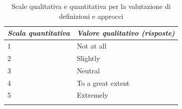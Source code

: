     \begin{center}
		\hspace*{-5mm}%
	\end{center}
	
     \begin{longtable}{| p{} | p{} |} 
      
      \hline\textbf{\textit{Scala quantitativa}} & \textbf{\textit{Valore qualitativo (risposte)}}
       
        
        \\ \hline
        \rowcolor{Gray}
        1       
        
        &  Not at all


        
        \\ \hline


        2     
        
        & Slightly



        \\ \hline
        \rowcolor{Gray}
        3     
        
        &  Neutral

        
        \\ \hline


        4    
        
        & To a great extent



        \\ \hline
        
        \rowcolor{Gray}
        5
        
        &  Extremely

        \\ \hline
        \caption{Scale qualitativa e quantitativa per la valutazione di definizioni e approcci} %
        \label{tab:myfirstlongtable}
    \end{longtable}
\newpage
